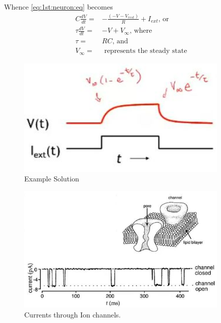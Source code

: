 \documentclass[]{article}
\begin{document}
Whence \eqref{eq:1st:neuron:eq} becomes
\begin{align*}
		C\frac{dV}{dt} =& -\frac{(-V-V_{rest})}{R} + I_{ext} \text{, or}\\
	\tau \frac{dV}{dt} =& -V + V_\infty \text{, where}\\
	\tau =& R C \text{, and} \\
	V_\infty =& \text{ represents the steady state}
\end{align*}

\begin{figure}[H]
	\caption[Example Solution]{Example Solution}
	\includegraphics[width=0.9\textwidth]{neuron-solution}
\end{figure}





\begin{figure}[H]
	\caption[Currents through Ion Channels]{Currents through Ion channels. }\label{eg:ion-channels}\label{fig:ion-channels}
	\includegraphics[width=0.9\textwidth]{ion-channels}
\end{figure}
\end{document}
